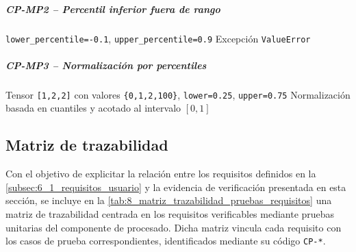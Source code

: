 \subparagraph{CP-MP2 -- Percentil inferior fuera de rango}\label{cp:CP-MP2}
\testcasetable
{\texttt{lower\_percentile=-0.1}, \texttt{upper\_percentile=0.9}}
{Excepción \texttt{ValueError}}

\subparagraph{CP-MP3 -- Normalización por percentiles}\label{cp:CP-MP3}
\testcasetable
{Tensor \texttt{[1,2,2]} con valores \texttt{\{0,1,2,100\}}, \texttt{lower=0.25}, \texttt{upper=0.75}}
{Normalización basada en cuantiles y acotado al intervalo $[0,1]$}

\newpage

\subsection{Matriz de trazabilidad} \label{subsec:8_3_matriz_trazabilidad}
Con el objetivo de explicitar la relación entre los requisitos definidos en la
\autoref{subsec:6_1_requisitos_usuario} y la evidencia de verificación presentada en
esta sección, se incluye en la \autoref{tab:8_matriz_trazabilidad_pruebas_requisitos} 
una matriz de trazabilidad centrada en los requisitos verificables mediante pruebas unitarias 
del componente de procesado. Dicha matriz vincula cada requisito con los casos de prueba
correspondientes, identificados mediante su código \texttt{CP-*}.

\newcommand{\cplink}[1]{\hyperref[cp:#1]{\texttt{#1}}}

